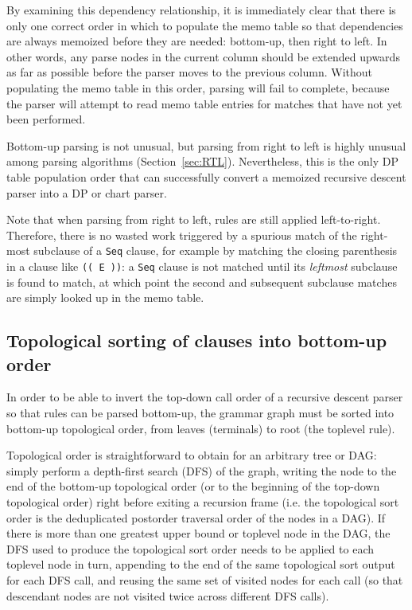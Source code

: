 \documentclass[manuscript,screen]{acmart}
\begin{document}
By examining this dependency relationship, it is immediately clear that there is only one correct order in which to populate the memo table so that dependencies are always memoized before they are needed: bottom-up, then right to left. In other words, any parse nodes in the current column should be extended upwards as far as possible before the parser moves to the previous column. Without populating the memo table in this order, parsing will fail to complete, because the parser will attempt to read memo table entries for matches that have not yet been performed.

Bottom-up parsing is not unusual, but parsing from right to left is highly unusual among parsing algorithms (Section~\ref{sec:RTL}). Nevertheless, this is the only DP table population order that can successfully convert a memoized recursive descent parser into a DP or chart parser.

Note that when parsing from right to left, rules are still applied left-to-right. Therefore, there is no wasted work triggered by a spurious match of the right-most subclause of a \texttt{Seq} clause, for example by matching the closing parenthesis in a clause like \texttt{(\textquotesingle{}(\textquotesingle{} E \textquotesingle{})\textquotesingle{})}: a \texttt{Seq} clause is not matched until its \emph{leftmost} subclause is found to match, at which point the second and subsequent subclause matches are simply looked up in the memo table.

\subsection{\label{sec:topoOrder}Topological sorting of clauses into bottom-up order}

In order to be able to invert the top-down call order of a recursive descent parser so that rules can be parsed bottom-up, the grammar graph must be sorted into bottom-up topological order, from leaves (terminals) to root (the toplevel rule).

Topological order is straightforward to obtain for an arbitrary tree or DAG: simply perform a depth-first search (DFS) of the graph, writing the node to the end of the bottom-up topological order (or to the beginning of the top-down topological order) right before exiting a recursion frame (i.e. the topological sort order is the deduplicated postorder traversal order of the nodes in a DAG). If there is more than one greatest upper bound or toplevel node in the DAG, the DFS used to produce the topological sort order needs to be applied to each toplevel node in turn, appending to the end of the same topological sort output for each DFS call, and reusing the same set of visited nodes for each call (so that descendant nodes are not visited twice across different DFS calls).
\end{document}
